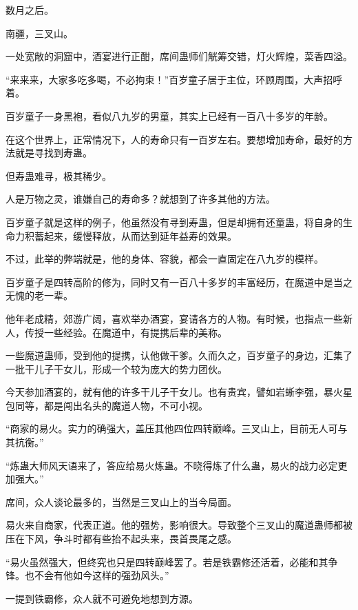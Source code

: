 
\begin{this_body}



数月之后。

南疆，三叉山。

一处宽敞的洞窟中，酒宴进行正酣，席间蛊师们觥筹交错，灯火辉煌，菜香四溢。

“来来来，大家多吃多喝，不必拘束！”百岁童子居于主位，环顾周围，大声招呼着。

百岁童子一身黑袍，看似八九岁的男童，其实上已经有一百八十多岁的年龄。

在这个世界上，正常情况下，人的寿命只有一百岁左右。要想增加寿命，最好的方法就是寻找到寿蛊。

但寿蛊难寻，极其稀少。

人是万物之灵，谁嫌自己的寿命多？就想到了许多其他的方法。

百岁童子就是这样的例子，他虽然没有寻到寿蛊，但是却拥有还童蛊，将自身的生命力积蓄起来，缓慢释放，从而达到延年益寿的效果。

不过，此举的弊端就是，他的身体、容貌，都会一直固定在八九岁的模样。

百岁童子是四转高阶的修为，同时又有一百八十多岁的丰富经历，在魔道中是当之无愧的老一辈。

他年老成精，郊游广阔，喜欢举办酒宴，宴请各方的人物。有时候，也指点一些新人，传授一些经验。在魔道中，有提携后辈的美称。

一些魔道蛊师，受到他的提携，认他做干爹。久而久之，百岁童子的身边，汇集了一批干儿子干女儿，形成一个较为庞大的势力团伙。

今天参加酒宴的，就有他的许多干儿子干女儿。也有贵宾，譬如岩蜥李强，暴火星包同等，都是闯出名头的魔道人物，不可小视。

“商家的易火。实力的确强大，盖压其他四位四转巅峰。三叉山上，目前无人可与其抗衡。”

“炼蛊大师风天语来了，答应给易火炼蛊。不晓得炼了什么蛊，易火的战力必定更加强大。”

席间，众人谈论最多的，当然是三叉山上的当今局面。

易火来自商家，代表正道。他的强势，影响很大。导致整个三叉山的魔道蛊师都被压在下风，争斗时都有些抬不起头来，畏首畏尾之感。

“易火虽然强大，但终究也只是四转巅峰罢了。若是铁霸修还活着，必能和其争锋。也不会有他如今这样的强劲风头。”

一提到铁霸修，众人就不可避免地想到方源。


\end{this_body}

